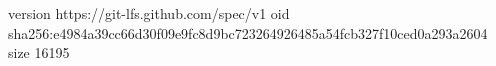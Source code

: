 version https://git-lfs.github.com/spec/v1
oid sha256:e4984a39cc66d30f09e9fc8d9bc723264926485a54fcb327f10ced0a293a2604
size 16195
